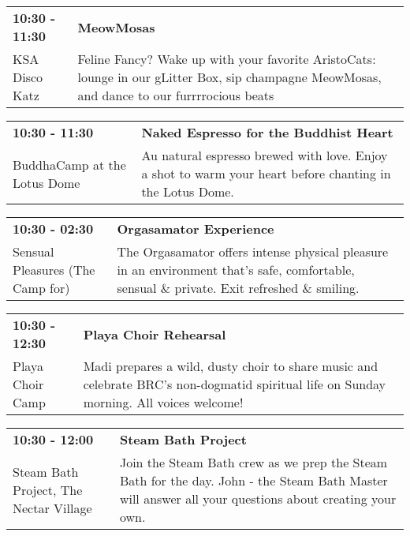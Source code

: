 \begin{tabular}{ p{1in} p{2.2in} }
    \textbf{10:30 - 11:30} & \textbf{MeowMosas} \\
    KSA Disco Katz \newline  & Feline Fancy? Wake up with your favorite AristoCats: lounge in our gLitter Box, sip champagne MeowMosas, and dance to our furrrrocious beats \\
    \hline 
\end{tabular}
    
\begin{tabular}{ p{1in} p{2.2in} }
    \textbf{10:30 - 11:30} & \textbf{Naked Espresso for the Buddhist Heart} \\
    BuddhaCamp at the Lotus Dome \newline  & Au natural espresso brewed with love.  Enjoy a shot to warm your heart before  chanting in the Lotus Dome. \\
    \hline 
\end{tabular}
    
\begin{tabular}{ p{1in} p{2.2in} }
    \textbf{10:30 - 02:30} & \textbf{Orgasamator Experience} \\
    Sensual Pleasures (The Camp for) \newline  & The Orgasamator offers intense physical pleasure in an environment that's safe, comfortable, sensual \& private.  Exit refreshed \& smiling. \\
    \hline 
\end{tabular}
    
\begin{tabular}{ p{1in} p{2.2in} }
    \textbf{10:30 - 12:30} & \textbf{Playa Choir Rehearsal} \\
    Playa Choir Camp \newline  & Madi prepares a wild, dusty choir to share music and celebrate BRC's non-dogmatid spiritual life on Sunday morning. All voices welcome! \\
    \hline 
\end{tabular}
    
\begin{tabular}{ p{1in} p{2.2in} }
    \textbf{10:30 - 12:00} & \textbf{Steam Bath Project} \\
    Steam Bath Project, The \newline Nectar Village & Join the Steam Bath crew as we prep the Steam Bath for the day. John - the Steam Bath Master will answer all your questions about creating your own. \\
    \hline 
\end{tabular}
    
